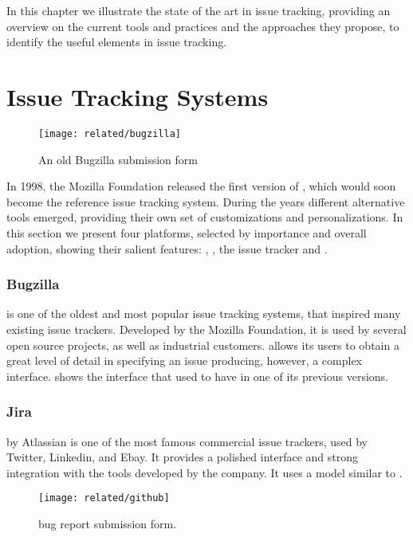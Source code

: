 In this chapter we illustrate the state of the art in issue tracking, providing an overview on the current tools and practices and the approaches they propose, to identify the useful elements in issue tracking.


\section{Issue Tracking Systems}\label{sec:related-bugtrackers}

\begin{figure}[t]
\centering
  \texttt{[image: related/bugzilla]}
  \caption{An old Bugzilla submission form}
  \label{fig:bugzilla-interface}
\end{figure}

In 1998, the Mozilla Foundation released the first version of \bzilla, which would soon become the reference issue tracking system.
During the years different alternative tools emerged, providing their own set of customizations and personalizations.
In this section we present four platforms, selected by importance and overall adoption, showing their salient features: \bzilla, \jira, the \gth issue tracker and \fbz.


\subsubsection{Bugzilla}
\bzilla{} is one of the oldest and most popular issue tracking systems, that inspired many existing issue trackers. Developed by the Mozilla Foundation, it is used by several open source projects, as well as industrial customers. \bzilla allows its users to obtain a great level of detail in specifying an issue producing, however, a complex interface.
 shows the interface that \bzilla used to have in one of its previous versions.


\subsubsection{Jira}
\jira{} by Atlassian is one of the most famous commercial issue trackers, used by Twitter, Linkedin, and Ebay. It provides a polished interface and strong integration with the tools developed by the company. It uses a model similar to \bzilla.

\begin{figure}[t]
\centering
 \texttt{[image: related/github]}
 \caption{\gth bug report submission form.}
 \label{fig:github-interface}
\end{figure}

